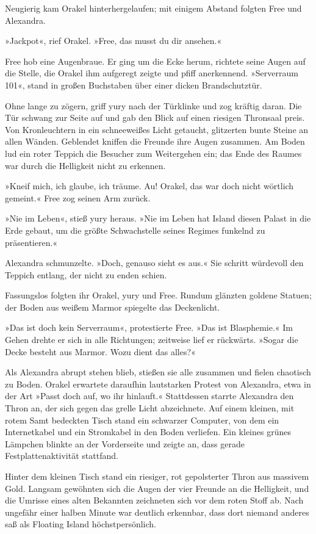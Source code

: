 Neugierig kam Orakel hinterhergelaufen; mit einigem Abstand folgten Free und Alexandra.

»Jackpot«, rief Orakel. »Free, das musst du dir ansehen.«

Free hob eine Augenbraue. Er ging um die Ecke herum, richtete seine Augen auf die Stelle, die Orakel ihm aufgeregt zeigte und pfiff anerkennend. »Serverraum 101«, stand in großen Buchstaben über einer dicken Brandschutztür.

Ohne lange zu zögern, griff yury nach der Türklinke und zog kräftig daran. Die Tür schwang zur Seite auf und gab den Blick auf einen riesigen Thronsaal preis. Von Kronleuchtern in ein schneeweißes Licht getaucht, glitzerten bunte Steine an allen Wänden. Geblendet kniffen die Freunde ihre Augen zusammen. Am Boden lud ein roter Teppich die Besucher zum Weitergehen ein; das Ende des Raumes war durch die Helligkeit nicht zu erkennen.

»Kneif mich, ich glaube, ich träume. Au! Orakel, das war doch nicht wörtlich gemeint.« Free zog seinen Arm zurück.

»Nie im Leben«, stieß yury heraus. »Nie im Leben hat Island diesen Palast in die Erde gebaut, um die größte Schwachstelle seines Regimes funkelnd zu präsentieren.«

Alexandra schmunzelte. »Doch, genauso sieht es aus.« Sie schritt würdevoll den Teppich entlang, der nicht zu enden schien.

Fassungslos folgten ihr Orakel, yury und Free. Rundum glänzten goldene Statuen; der Boden aus weißem Marmor spiegelte das Deckenlicht.

»Das ist doch kein Serverraum«, protestierte Free. »Das ist Blasphemie.« Im Gehen drehte er sich in alle Richtungen; zeitweise lief er rückwärts. »Sogar die Decke besteht aus Marmor. Wozu dient das alles?«

Als Alexandra abrupt stehen blieb, stießen sie alle zusammen und fielen chaotisch zu Boden. Orakel erwartete daraufhin lautstarken Protest von Alexandra, etwa in der Art »Passt doch auf, wo ihr hinlauft.« Stattdessen starrte Alexandra den Thron an, der sich gegen das grelle Licht abzeichnete. Auf einem kleinen, mit rotem Samt bedeckten Tisch stand ein schwarzer Computer, von dem ein Internetkabel und ein Stromkabel in den Boden verliefen. Ein kleines grünes Lämpchen blinkte an der Vorderseite und zeigte an, dass gerade Festplattenaktivität stattfand.

Hinter dem kleinen Tisch stand ein riesiger, rot gepolsterter Thron aus massivem Gold. Langsam gewöhnten sich die Augen der vier Freunde an die Helligkeit, und die Umrisse eines alten Bekannten zeichneten sich vor dem roten Stoff ab. Nach ungefähr einer halben Minute war deutlich erkennbar, dass dort niemand anderes saß als Floating Island höchstpersönlich.

